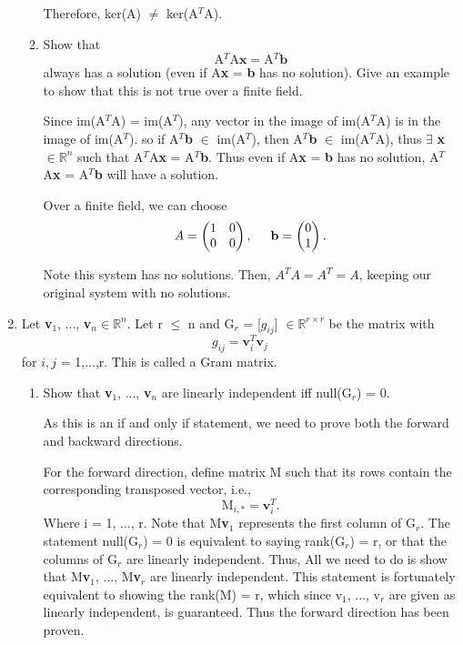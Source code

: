 \documentclass[12pt]{article}
\newcommand{\hop}{\vspace{1mm}}
\newcommand{\jump}{\vspace{5mm}}
\newcommand{\R}{\mathbb{R}}
\begin{document}
\begin{enumerate}[leftmargin=\labelsep]
\begin{enumerate}
Therefore, ker(A) $\neq$ ker(A$^T$A).

\jump
\item Show that
\[
\text{A$^T$A}\textbf{x} = \text{A$^T$}\textbf{b}
\]
always has a solution (even if A\textbf{x} = \textbf{b} has no solution). Give an example to show that this is not true over a finite field.  

\hop
Since im(A$^T$A) = im(A$^T$), any vector in the image of im(A$^T$A) is in the image of im(A$^T$). so if A$^T$\textbf{b} $\in$ im(A$^T$), then A$^T$\textbf{b} $\in$ im(A$^T$A), thus $\exists$ \textbf{x} $\in \R^{n}$ such that A$^T$A\textbf{x} = A$^T$\textbf{b}. Thus even if A\textbf{x} = \textbf{b} has no solution, A$^T$A\textbf{x} = A$^T$\textbf{b} will have a solution. 

Over a finite field, we can choose 
\[
A = 
\begin{pmatrix}
    1 &0    \\
    0 &0
\end{pmatrix}
,
\hspace{5mm}
\textbf{b} = 
\begin{pmatrix}
    0   \\
    1
\end{pmatrix}.
\]

\hop
Note this system has no solutions. Then, $A^TA = A^T = A$, keeping our original system with no solutions.
\end{enumerate}
\jump
\item Let \textbf{v}$_1$, ..., \textbf{v}$_n \in \R^n$. Let r $\leq$ n and G$_r$ = [$g_{ij}$] $\in \R^{r \times r}$ be the matrix with
\[
g_{ij} = \textbf{v}_{i}^{T}\textbf{v}_{j}
\]
for $i, j$ = 1,...,r. This is called a Gram matrix. 
\begin{enumerate}
    \item Show that \textbf{v}$_1$, ..., \textbf{v}$_n$ are linearly independent iff null(G$_r$) = 0. 
    
    \hop
    As this is an if and only if statement, we need to prove both the forward and backward directions. 
    
    For the forward direction, define matrix M such that its rows contain the corresponding transposed vector, i.e., 
    \[
    \text{M}_{i,*} = \textbf{v}_i^T.
    \]
    Where i = 1, ..., r. Note that M\textbf{v}$_1$ represents the first column of G$_r$. The statement null(G$_r$) = 0 is equivalent to saying rank(G$_r$) = r, or that the columns of G$_r$ are linearly independent. Thus, All we need to do is show that M\textbf{v}$_1$, ..., M\textbf{v}$_r$ are linearly independent. This statement is fortunately equivalent to showing the rank(M) = r, which since {v}$_1$, ..., {v}$_r$ are given as linearly independent, is guaranteed.
    Thus the forward direction has been proven.


\end{enumerate}
\end{enumerate}
\end{document}

